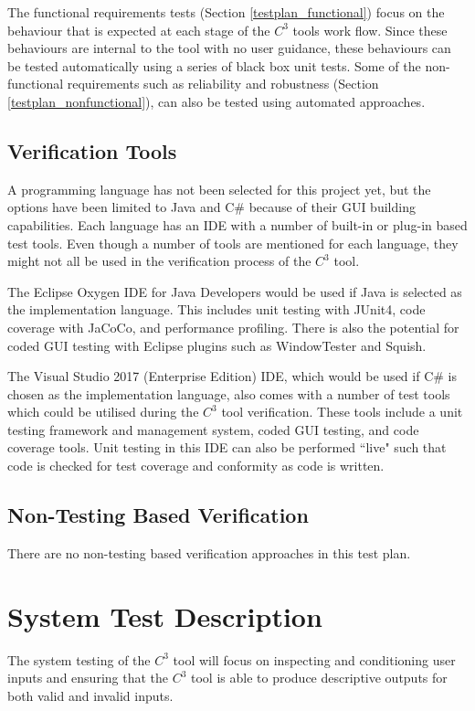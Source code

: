 \documentclass[12pt, titlepage]{article}
\newcommand{\prognameAbbrv}{$C^{3}$}
\begin{document}
The functional requirements tests (Section \ref{testplan_functional}) focus on 
the behaviour that is expected at each stage of the \prognameAbbrv{} tools work 
flow. Since these behaviours are internal to the tool with no user guidance, 
these behaviours can be tested automatically using a series of black box unit 
tests. Some of the non-functional requirements such as reliability and 
robustness (Section \ref{testplan_nonfunctional}), can also be tested using 
automated approaches.

\subsection{Verification Tools}
A programming language has not been selected for this project yet, but the 
options have been limited to Java and C\# because of their GUI building 
capabilities. Each language has an IDE with a number of built-in or plug-in 
based test tools. Even though a number of tools are mentioned for each 
language, they might not all be used in the verification process of the 
\prognameAbbrv{} tool.

The Eclipse Oxygen IDE for Java Developers would be used if Java is selected as 
the implementation language. This includes unit testing with JUnit4, code 
coverage with JaCoCo, and performance profiling. There is also the potential 
for coded GUI testing with Eclipse plugins such as WindowTester and Squish.

The Visual Studio 2017 (Enterprise Edition) IDE, which would be used if C\# is 
chosen as the implementation language, also comes with a number of test tools 
which could be utilised during the \prognameAbbrv{} tool verification. These 
tools include a unit testing framework and management system, coded GUI 
testing, and code coverage tools. Unit testing in this IDE can also be 
performed ``live" such that code is checked for test coverage and conformity as 
code is written.

\subsection{Non-Testing Based Verification}

There are no non-testing based verification approaches in this test plan.

\section{System Test Description}
The system testing of the \prognameAbbrv{} tool will focus on inspecting and 
conditioning user inputs and ensuring that the \prognameAbbrv{} tool is able to 
produce descriptive outputs for both valid and invalid inputs. 
\end{document}

